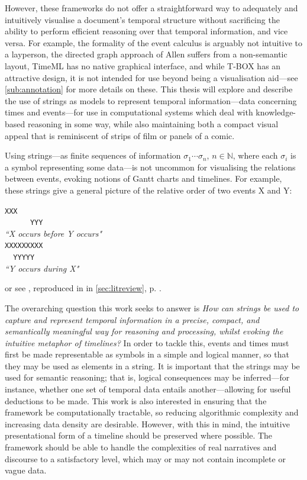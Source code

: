 \documentclass[a4paper,12pt,leqno]{article}
\begin{document}
However, these frameworks do not offer a straightforward way to adequately and intuitively visualise a document's temporal structure without sacrificing the ability to perform efficient reasoning over that temporal information, and vice versa. For example, the formality of the event calculus is arguably not intuitive to a layperson, the directed graph approach of Allen suffers from a non-semantic layout, TimeML has no native graphical interface, and while T-BOX has an attractive design, it is not intended for use beyond being a visualisation aid---see \cref{sub:annotation} for more details on these. This thesis will explore and describe the use of strings as models to represent temporal information---data concerning times and events---for use in computational systems which deal with knowledge-based reasoning in some way, while also maintaining both a compact visual appeal that is reminiscent of strips of film or panels of a comic.

Using strings---as finite sequences of information $\sigma_1 \cdots \sigma_n$, $n \in \mathbb{N}$, where each $\sigma_i$ is a symbol representing some data---is not uncommon for visualising the relations between events, evoking notions of Gantt charts and timelines. For example, these strings give a general picture of the relative order of two events X and Y:

{
\singlespacing
\begin{center}
\verb|XXX      |\\
\verb|      YYY|\\
\textit{``X occurs before Y occurs"}\\
\vspace{1em}
\verb|XXXXXXXXX|\\
\verb|  YYYYY  |\\
\textit{``Y occurs during X"}\\
\end{center}
}
\noindent
or see \citet[p. 835, Figure 2]{allen1983maintaining}, reproduced in  in \cref{sec:litreview}, p. \pageref{fig:allens-pictorial}.

The overarching question this work seeks to answer is {\sl How can strings be used to capture and represent temporal information in a precise, compact, and semantically meaningful way for reasoning and processing, whilst evoking the intuitive metaphor of timelines?} In order to tackle this, events and times must first be made representable as symbols in a simple and logical manner, so that they may be used as elements in a string. It is important that the strings may be used for semantic reasoning; that is, logical consequences may be inferred---for instance, whether one set of temporal data entails another---allowing for useful deductions to be made. This work is also interested in ensuring that the framework be computationally tractable, so reducing algorithmic complexity and increasing data density are desirable. However, with this in mind, the intuitive presentational form of a timeline should be preserved where possible. The framework should be able to handle the complexities of real narratives and discourse to a satisfactory level, which may or may not contain incomplete or vague data.
\end{document}
